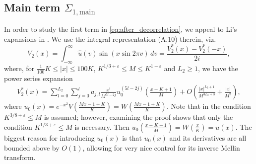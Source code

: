 \documentclass[reqno, 12pt]{amsart}
\newcommand{\main}{\mathrm{main}}
\renewcommand{\geq}{\geqslant}
\renewcommand{\leq}{\leqslant}
\newcommand{\chan}[1]{{\color{blue}\sf #1}}
\begin{document}
\subsection{Main term {$\Sigma_{1,\main}$}}
{In order to study the first term in \eqref{eq:after_decorrelation}, we appeal to Li's expansions in \cite[Proposition~A.3]{li_bounds_2011}. }
%
We use the integral representation (A.10) therein, viz.
\[ V_2(x) = \int_{-\infty}^\infty \hat{u}(v) \sin (x \sin 2\pi v) \,dv = \frac{V_2^*(x) - V_2^*(-x)}{2i}, \]
where, for $\frac{1}{100} K \leq |x| \leq 100K$, $K^{1/3 + \varepsilon} \leq M \leq {K^{1-\varepsilon}}$ and $L_2 \geq 1$, we have the power series expansion
\begin{align}
\label{eq:V2-expansion}
  V_2^*(x) = \sum_{l = 0}^{L_2} \sum_{j =0}^l a_{j,l} \frac{x^l}{M^{5l-2j}} u_0^{(5l-2j)} \left( \frac{x-K+1}{M} \right) + O \left( \frac{|x|^{L_2+1}}{M^{3L_2+3}} + \frac{|x|}{M^7} \right),
\end{align}
where
$u_0(x) = e^{-x^2} V\left( \frac{Mx-1+K}{K} \right) = {W} \left( \frac{Mx-1+K}{K} \right)$. Note that in \cite[Proposition 5.1]{li_bounds_2011} the condition $K^{3/8 + \varepsilon} \leq M $ is assumed; however, examining the proof shows that only the condition $K^{1/3 + \varepsilon} \leq M $ is necessary. Then $u_0(\frac{x-K+1}{M}) = {W}(\frac{x}{K}) = u(x)$.
%
{The biggest reason for introducing $u_0(x)$ is that $u_0(x)$} and its derivatives are all bounded above by {$O(1)$, allowing for very nice control for its inverse Mellin transform.}
\end{document}
